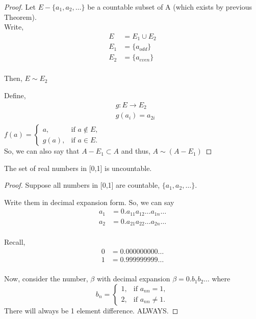 \documentclass[11pt,fleqn]{book} %
\begin{document}
\begin{proof}
	Let $E - \{a_1, a_2,\dots \}$ be a countable subset of A (which exists by previous Theorem).\\
	Write, 
	\begin{align*}
		E &= E_1 \cup E_2\\
		E_1 &= \{a_{odd}\}\\
		E_2 &= \{a_{even}\}\\
	\end{align*}

	Then, $E \sim E_2$

	Define,
	\begin{align*}
		&g: E \rightarrow E_2\\
		&g(a_i) = a_{2i}\\
	\end{align*}
		$f(a) = \begin{cases}
				  	a, & \text{if } a \notin E, \\
				  	g(a), & \text{if } a \in E.
					\end{cases} $\\
	So, we can also say that $A- E_1 \subset A$ and thus, $A \sim (A-E_1)$
\end{proof}

\begin{theorem}
	The set of real numbers in [0,1] is uncountable.
\end{theorem}

\begin{proof}
	Suppose all numbers in [0,1] are countable, $\{a_1, a_2, \dots \}$.

	Write them in decimal expansion form. So, we can say
	\begin{align*}
		a_1 &= 0.a_{11} a_{12}\dots a_{1n}\dots\\
		a_2 &= 0.a_{21} a_{22}\dots a_{2n}\dots\\
	\end{align*}

	Recall,
	\begin{align*}
	0 &= 0.000000000\dots\\
	1 &= 0.999999999\dots\\	
	\end{align*}
	
	Now, consider the number, $\beta$ with decimal expansion $\beta = 0.b_1b_2\dots$ where \\
	$$b_n = \begin{cases}
	1, & \text{if } a_{nn} = 1, \\
	2, & \text{if } a_{nn} \neq 1.
	\end{cases}$$
	There will always be 1 element difference. ALWAYS.
\end{proof}
\end{document}

